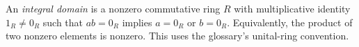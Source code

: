 
An \emph{integral domain} is a nonzero commutative ring $R$ with multiplicative identity $1_R\ne0_R$ such that $ab=0_R$ implies $a=0_R$ or $b=0_R$. Equivalently, the product of two nonzero elements is nonzero. This uses the glossary's unital-ring convention.
